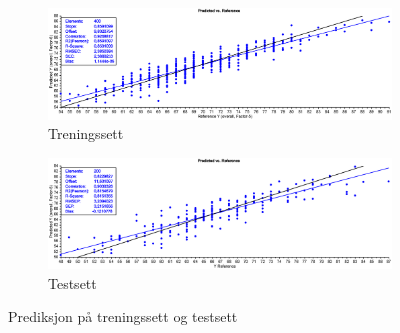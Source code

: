 \begin{figure}[h]
	\centering
	\begin{subfigure}[t]{0.96\textwidth}
		\centering
		\includegraphics[width=\textwidth]{figurer/fifa-pls-training-pvsr}
		\caption{Treningssett}
		\label{}
	\end{subfigure}
	\begin{subfigure}[t]{0.96\textwidth}
		\centering
		\includegraphics[width=\textwidth]{figurer/fifa-pls-test-pvsr}
		\caption{Testsett}
		\label{}
	\end{subfigure}
	\label{fig:fifa-pls-train-vs-test}
	\caption{Prediksjon på treningssett og testsett}
\end{figure}

